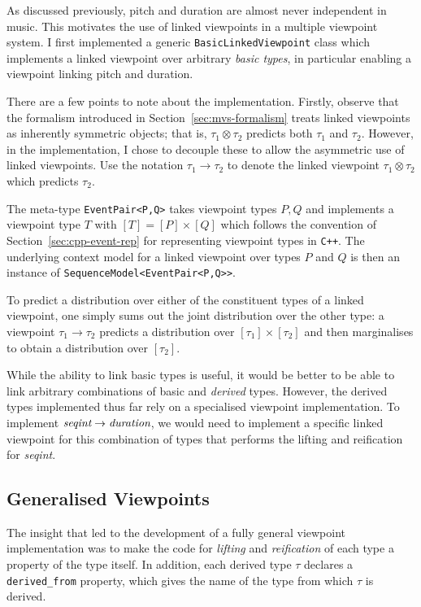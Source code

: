 \documentclass[12pt,a4paper,twoside,openright]{report}
\begin{document}
As discussed previously, pitch and duration are almost never independent in
music. This motivates the use of linked viewpoints in a multiple viewpoint
system. I first implemented a generic \texttt{BasicLinkedViewpoint} class which
implements a linked viewpoint over arbitrary \emph{basic types}, in particular
enabling a viewpoint linking pitch and duration.

There are a few points to note about the implementation. Firstly, observe that
the formalism introduced in Section~\ref{sec:mvs-formalism} treats linked
viewpoints as inherently symmetric objects; that is, $\tau_1 \otimes \tau_2$
predicts both $\tau_1$ and $\tau_2$. However, in the implementation, I chose to
decouple these to allow the asymmetric use of linked viewpoints. Use the
notation $\tau_1 \rightarrow \tau_2$ to denote the linked viewpoint $\tau_1
\otimes \tau_2$ which predicts $\tau_2$.

The meta-type \texttt{EventPair<P,Q>} takes viewpoint types $P,Q$ and implements
a viewpoint type $T$ with $[T] = [P] \times [Q]$ which follows the convention of
Section~\ref{sec:cpp-event-rep} for representing viewpoint types in
\texttt{C++}. The underlying context model for a linked viewpoint over types $P$
and $Q$ is then an instance of \texttt{SequenceModel<EventPair<P,Q>>}.

To predict a distribution over either of the constituent types of a linked
viewpoint, one simply sums out the joint distribution over the other type: a
viewpoint $\tau_1 \rightarrow \tau_2$ predicts a distribution over $[\tau_1]
\times [\tau_2]$ and then marginalises to obtain a distribution over $[\tau_2]$.

While the ability to link basic types is useful, it would be better to be able
to link arbitrary combinations of basic and \emph{derived} types. However, the
derived types implemented thus far rely on a specialised viewpoint
implementation. To implement $\emph{seqint} \rightarrow \emph{duration}$, we
would need to implement a specific linked viewpoint for this combination of
types that performs the lifting and reification for \emph{seqint}.

\subsection{Generalised Viewpoints}

The insight that led to the development of a fully general viewpoint
implementation was to make the code for \emph{lifting} and \emph{reification} of
each type a property of the type itself. In addition, each derived type $\tau$
declares a \texttt{derived\_from} property, which gives the name of the type
from which $\tau$ is derived. 
\end{document}
